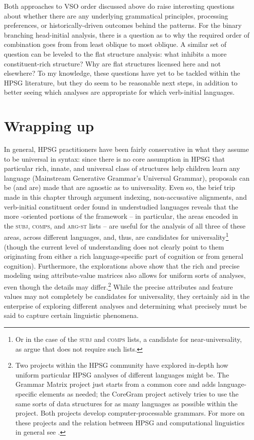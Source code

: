 \documentclass[output=paper
 	        ,biblatex
                ,babelshorthands
                ,newtxmath
                ,draftmode
                ,colorlinks, citecolor=brown
]{langscibook}
\begin{document}
Both approaches to VSO order discussed above do raise interesting questions about whether there are any underlying grammatical principles, processing preferences, or historically-driven outcomes behind the patterns. For the binary branching head-initial analysis, there is a question as to why the required order of combination goes from from least oblique to most oblique. A similar set of question can be leveled to the flat structure analysis: what inhibits a more constituent-rich structure? Why are flat structures licensed here and not elsewhere? To my knowledge, these questions have yet to be tackled within the HPSG literature, but they do seem to be reasonable next steps, in addition to better seeing which analyses are appropriate for which verb-initial languages. 
	
\section{Wrapping up}

In general, HPSG practitioners have been fairly conservative in what they assume to be universal in
syntax: since there is no core assumption in HPSG that particular rich, innate, and universal class
of structures help children learn any language (Mainstream Generative Grammar's Universal
Grammar\indexug), proposals can be (and are) made that are agnostic as to universality. Even so, the
brief trip made in this chapter through argument indexing, non-accusative alignments, and
verb-initial constituent order found in understudied languages reveals that the more
-oriented portions of the framework -- in particular, the areas encoded in the
\textsc{subj}, \textsc{comps}, and \textsc{arg-st} lists -- are useful for the analysis of all three
of these areas, across different languages, and, thus, are candidates for universality\footnote{Or
  in the case of the \textsc{subj} and \textsc{comps} lists, a candidate for near-universality, as
  \citet{KM15} argue that  does not require such lists.} (though the current level of
understanding does not clearly point to them originating from either a rich language-specific part
of cognition or from general cognition). Furthermore, the explorations above show that the rich and
precise modeling using attribute-value matrices also allows for uniform sorts of analyses, even
though the details may differ.\footnote{Two projects within the HPSG community have explored
  in-depth how uniform particular HPSG analyses of different languages might be. The Grammar Matrix
  project \citep{BDFPS2010a-u} just starts from a common core and adds language-specific elements as
  needed; the CoreGram project \citep{MuellerCoreGram} actively tries to use the same sorts of data
  structures for as many languages as possible within the project. Both projects develop
  computer-processable grammars. For more on these projects and the relation between HPSG and
  computational linguistics in general see .} While the precise attributes and
feature values may not completely be candidates for universality, they certainly aid in the
enterprise of exploring different analyses and determining what precisely must be said to capture
certain linguistic phenomena.
\end{document}
